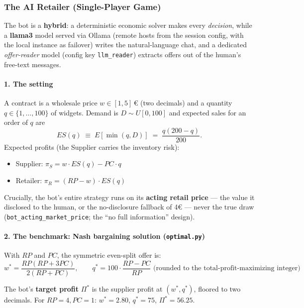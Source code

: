 \subsubsection*{The AI Retailer (Single-Player Game)}

The bot is a \textbf{hybrid}: a deterministic economic solver makes every
\textit{decision}, while a \textbf{llama3} model served via Ollama (remote
hosts from the session config, with the local instance as failover) writes
the natural-language chat, and a dedicated \textit{offer-reader} model
(config key \texttt{llm\_reader}) extracts offers out of the human's
free-text messages.

\paragraph*{1. The setting}
A contract is a wholesale price $w \in [1,5]$\,€ (two decimals) and a
quantity $q \in \{1,\dots,100\}$ of widgets. Demand is $D \sim U[0,100]$
and expected sales for an order of $q$ are
$$ ES(q) \;\equiv\; E[\min(q,D)] \;=\; \frac{q(200-q)}{200}. $$
Expected profits (the Supplier carries the inventory risk):
\begin{itemize}
    \item Supplier: $\pi_S = w \cdot ES(q) - PC \cdot q$
    \item Retailer: $\pi_R = (RP - w) \cdot ES(q)$
\end{itemize}

Crucially, the bot's entire strategy runs on its \textbf{acting retail
price} --- the value it disclosed to the human, or the no-disclosure
fallback of 4€ --- never the true draw
(\texttt{bot\_acting\_market\_price}; the ``no full information'' design).

\paragraph*{2. The benchmark: Nash bargaining solution (\texttt{optimal.py})}
With $RP$ and $PC$, the symmetric even-split offer is:
$$ w^* = \frac{RP(RP + 3PC)}{2(RP + PC)}, \qquad
   q^* = 100\cdot\frac{RP - PC}{RP}
   \text{ (rounded to the total-profit-maximizing integer)} $$

The bot's \textbf{target profit} $\Pi^*$ is the supplier profit at
$(w^*, q^*)$, floored to two decimals. For $RP=4, PC=1$: $w^*=2.80$,
$q^*=75$, $\Pi^* = 56.25$.

